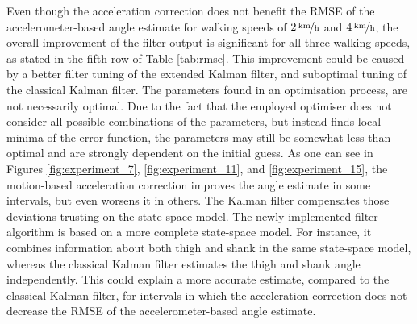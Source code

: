  Even though the acceleration correction does not benefit the RMSE of the accelerometer-based angle estimate for walking speeds of $\unitfrac[2]{km}{h}$ and $\unitfrac[4]{km}{h}$, the overall improvement of the filter output is significant for all three walking speeds, as stated in the fifth row of Table \ref{tab:rmse}. This improvement could be caused by a better filter tuning of the extended Kalman filter, and suboptimal tuning of the classical Kalman filter. The parameters found in an optimisation process, are not necessarily optimal. Due to the fact that the employed optimiser does not consider all possible combinations of the parameters, but instead finds local minima of the error function, the parameters may still be somewhat less than optimal and are strongly dependent on the initial guess. As one can see in Figures \ref{fig:experiment_7}, \ref{fig:experiment_11}, and \ref{fig:experiment_15}, the motion-based acceleration correction improves the angle estimate in some intervals, but even worsens it in others. The Kalman filter compensates those deviations trusting on the state-space model. The newly implemented filter algorithm is based on a more complete state-space model. For instance, it combines information about both thigh and shank in the same state-space model, whereas the classical Kalman filter estimates the thigh and shank angle independently. This could explain a more accurate estimate, compared to the classical Kalman filter, for intervals in which the acceleration correction does not decrease the RMSE of the accelerometer-based angle estimate.
